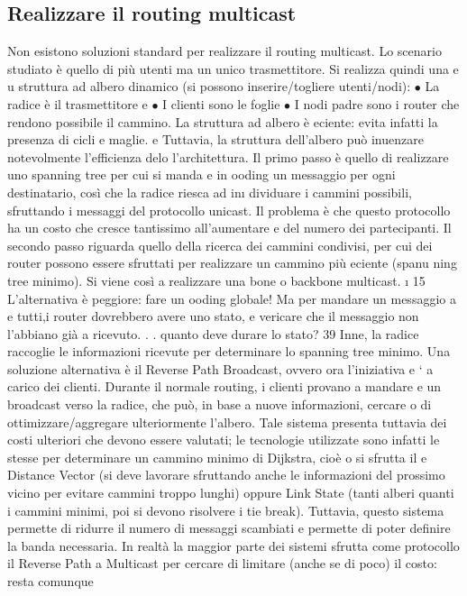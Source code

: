 \subsection{Realizzare il routing multicast}
Non esistono soluzioni standard per realizzare il routing multicast. Lo scenario
studiato è quello di più utenti ma un unico trasmettitore. Si realizza quindi una
e
u
struttura ad albero dinamico (si possono inserire/togliere utenti/nodi):
$\bullet$ La radice è il trasmettitore
e
$\bullet$ I clienti sono le foglie
$\bullet$ I nodi padre sono i router che rendono possibile il cammino.
La struttura ad albero è eciente: evita infatti la presenza di cicli e maglie.
e
Tuttavia, la struttura dell'albero può inuenzare notevolmente l'efficienza delo
l'architettura.
Il primo passo è quello di realizzare uno spanning tree per cui si manda
e
in ooding un messaggio per ogni destinatario, così che la radice riesca ad in\i{}
dividuare i cammini possibili, sfruttando i messaggi del protocollo unicast. Il
problema è che questo protocollo ha un costo che cresce tantissimo all'aumentare
e
del numero dei partecipanti.
Il secondo passo riguarda quello della ricerca dei cammini condivisi, per cui
dei router possono essere sfruttati per realizzare un cammino più eciente (spanu
ning tree minimo). Si viene così a realizzare una bone o backbone multicast.
\i{}
15 L'alternativa è peggiore: fare un ooding globale! Ma per mandare un messaggio a
e
tutti,i router dovrebbero avere uno stato, e vericare che il messaggio non l'abbiano già
a
ricevuto. . . quanto deve durare lo stato?
39
Inne, la radice raccoglie le informazioni ricevute per determinare lo spanning
tree minimo.
Una soluzione alternativa è il Reverse Path Broadcast, ovvero ora l'iniziativa
e
` a carico dei clienti. Durante il normale routing, i clienti provano a mandare
e
un broadcast verso la radice, che può, in base a nuove informazioni, cercare
o
di ottimizzare/aggregare ulteriormente l'albero. Tale sistema presenta tuttavia
dei costi ulteriori che devono essere valutati; le tecnologie utilizzate sono infatti
le stesse per determinare un cammino minimo di Dijkstra, cioè o si sfrutta il
e
Distance Vector (si deve lavorare sfruttando anche le informazioni del prossimo
vicino per evitare cammini troppo lunghi) oppure Link State (tanti alberi quanti
i cammini minimi, poi si devono risolvere i tie break). Tuttavia, questo sistema
permette di ridurre il numero di messaggi scambiati e permette di poter definire
la banda necessaria.
In realtà la maggior parte dei sistemi sfrutta come protocollo il Reverse Path
a
Multicast per cercare di limitare (anche se di poco) il costo: resta comunque
